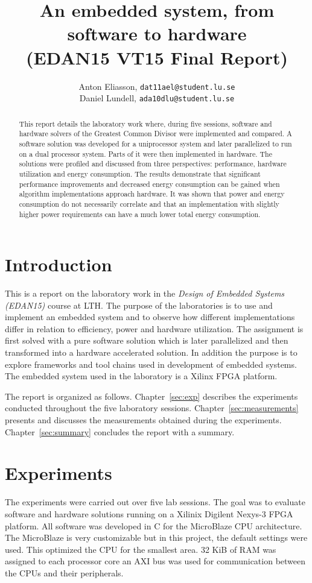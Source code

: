 \documentclass[11pt]{article}
\title{An embedded system, from software to hardware\\\small{(EDAN15 VT15 Final Report)}}
\author{
Anton Eliasson, \texttt{dat11ael@student.lu.se}\\
Daniel Lundell, \texttt{ada10dlu@student.lu.se}
}
\begin{document}
\lstset{
	language=C,
	captionpos=b,
	basicstyle=\footnotesize\ttfamily
}

\maketitle

\begin{abstract}
This report details the laboratory work where, during five sessions, software and hardware solvers of the Greatest Common Divisor were implemented and compared. A software solution was developed for a uniprocessor system and later parallelized to run on a dual processor system. Parts of it were then implemented in hardware. The solutions were profiled and discussed from three perspectives: performance, hardware utilization and energy consumption. The results demonstrate that significant performance improvements and decreased energy consumption can be gained when algorithm implementations approach hardware. It was shown that power and energy consumption do not necessarily correlate and that an implementation with slightly higher power requirements can have a much lower total energy consumption.
\end{abstract}

\section{Introduction}
This is a report on the laboratory work in the \emph{Design of Embedded Systems (EDAN15)} course at LTH. The purpose of the laboratories is to use and implement an embedded system and to observe how different implementations differ in relation to efficiency, power and hardware utilization. The assignment is first solved with a pure software solution which is later parallelized and then transformed into a hardware accelerated solution. In addition the purpose is to explore frameworks and tool chains used in development of embedded systems. The embedded system used in the laboratory is a Xilinx FPGA platform.

The report is organized as follows. Chapter~\ref{sec:exp} describes the experiments conducted throughout the five laboratory sessions. Chapter~\ref{sec:measurements} presents and discusses the measurements obtained during the experiments. Chapter~\ref{sec:summary} concludes the report with a summary.

\section{Experiments\label{sec:exp}}
The experiments were carried out over five lab sessions. The goal was to evaluate software and hardware solutions running on a Xilinix Digilent Nexys-3 FPGA platform. All software was developed in C for the MicroBlaze\cite{microblaze} CPU architecture. The MicroBlaze is very customizable but in this project, the default settings were used. This optimized the CPU for the smallest area. 32 KiB of RAM was assigned to each processor core an AXI bus was used for communication between the CPUs and their peripherals.
\end{document}
